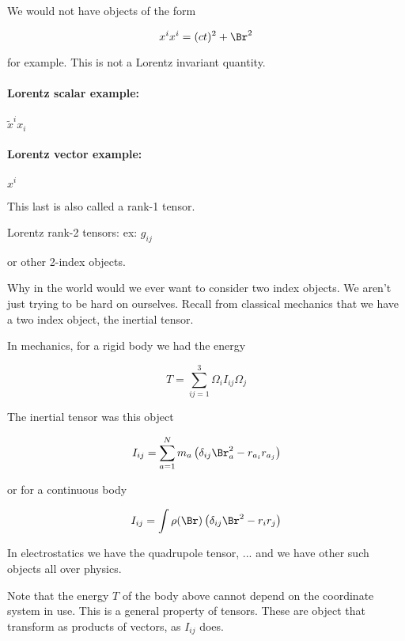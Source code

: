 We would not have objects of the form 

\begin{equation}\label{eqn:relativisticElectrodynamicsL6:190}
x^i x^i = (ct)^2 + \Br^2
\end{equation}

for example.  This is not a Lorentz invariant quantity.

\paragraph{Lorentz scalar example:} $\tilde{x}^i x_i$
\paragraph{Lorentz vector example:} $x^i$

This last is also called a rank-1 tensor.

Lorentz rank-2 tensors: ex: $g_{ij}$

or other 2-index objects.

Why in the world would we ever want to consider two index objects.  We aren't just trying to be hard on ourselves.  Recall from classical mechanics that we have a two index object, the inertial tensor.

In mechanics, for a rigid body we had the energy

\begin{equation}\label{eqn:relativisticElectrodynamicsL6:200}
T = \sum_{ij = 1}^3 \Omega_i I_{ij} \Omega_j
\end{equation}

The inertial tensor was this object 

\begin{equation}\label{eqn:relativisticElectrodynamicsL6:210}
I_{ij} = \sum_{a = 1}^N m_a \left(\delta_{ij} \Br_a^2 - r_{a_i} r_{a_j} \right)
\end{equation}

or for a continuous body

\begin{equation}\label{eqn:relativisticElectrodynamicsL6:220}
I_{ij} = \int \rho(\Br) \left(\delta_{ij} \Br^2 - r_{i} r_{j} \right)
\end{equation}

In electrostatics we have the quadrupole tensor, ... and we have other such objects all over physics.

Note that the energy $T$ of the body above cannot depend on the coordinate system in use.  This is a general property of tensors.  These are object that transform as products of vectors, as $I_{ij}$ does.  

